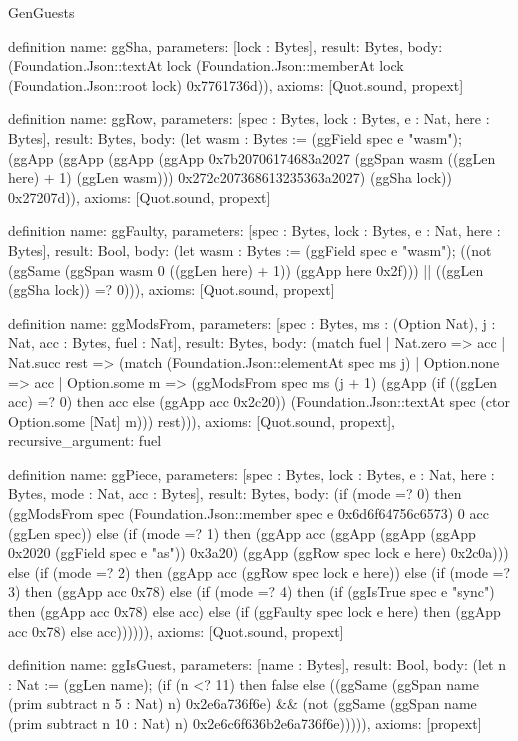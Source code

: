 \begin{lexlean}{GenGuests}
\begin{semanticmodule}
definition{
  name: ggSha,
  parameters: [lock : Bytes],
  result: Bytes,
  body: (Foundation.Json::textAt lock (Foundation.Json::memberAt lock (Foundation.Json::root lock) 0x7761736d)),
  axioms: [Quot.sound, propext]
}

definition{
  name: ggRow,
  parameters: [spec : Bytes, lock : Bytes, e : Nat, here : Bytes],
  result: Bytes,
  body: (let wasm : Bytes := (ggField spec e "wasm"); (ggApp (ggApp (ggApp (ggApp 0x7b20706174683a2027 (ggSpan wasm ((ggLen here) + 1) (ggLen wasm))) 0x272c207368613235363a2027) (ggSha lock)) 0x27207d)),
  axioms: [Quot.sound, propext]
}

definition{
  name: ggFaulty,
  parameters: [spec : Bytes, lock : Bytes, e : Nat, here : Bytes],
  result: Bool,
  body: (let wasm : Bytes := (ggField spec e "wasm"); ((not (ggSame (ggSpan wasm 0 ((ggLen here) + 1)) (ggApp here 0x2f))) || ((ggLen (ggSha lock)) =? 0))),
  axioms: [Quot.sound, propext]
}

definition{
  name: ggModsFrom,
  parameters: [spec : Bytes, ms : (Option Nat), j : Nat, acc : Bytes, fuel : Nat],
  result: Bytes,
  body: (match fuel
    | Nat.zero => acc
    | Nat.succ rest => (match (Foundation.Json::elementAt spec ms j)
      | Option.none => acc
      | Option.some m => (ggModsFrom spec ms (j + 1) (ggApp (if ((ggLen acc) =? 0) then acc else (ggApp acc 0x2c20)) (Foundation.Json::textAt spec (ctor Option.some [Nat] m))) rest))),
  axioms: [Quot.sound, propext],
  recursive_argument: fuel
}

definition{
  name: ggPiece,
  parameters: [spec : Bytes, lock : Bytes, e : Nat, here : Bytes, mode : Nat, acc : Bytes],
  result: Bytes,
  body: (if (mode =? 0) then (ggModsFrom spec (Foundation.Json::member spec e 0x6d6f64756c6573) 0 acc (ggLen spec)) else (if (mode =? 1) then (ggApp acc (ggApp (ggApp (ggApp 0x2020 (ggField spec e "as")) 0x3a20) (ggApp (ggRow spec lock e here) 0x2c0a))) else (if (mode =? 2) then (ggApp acc (ggRow spec lock e here)) else (if (mode =? 3) then (ggApp acc 0x78) else (if (mode =? 4) then (if (ggIsTrue spec e "sync") then (ggApp acc 0x78) else acc) else (if (ggFaulty spec lock e here) then (ggApp acc 0x78) else acc)))))),
  axioms: [Quot.sound, propext]
}

definition{
  name: ggIsGuest,
  parameters: [name : Bytes],
  result: Bool,
  body: (let n : Nat := (ggLen name); (if (n <? 11) then false else ((ggSame (ggSpan name (prim subtract n 5 : Nat) n) 0x2e6a736f6e) && (not (ggSame (ggSpan name (prim subtract n 10 : Nat) n) 0x2e6c6f636b2e6a736f6e))))),
  axioms: [propext]
}


\end{semanticmodule}
\end{lexlean}
